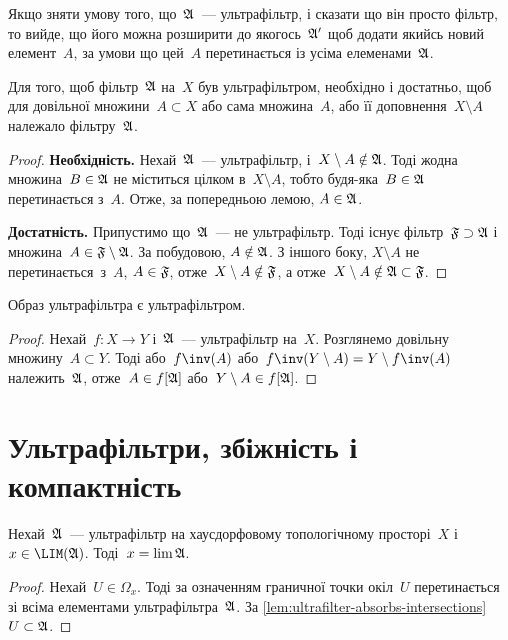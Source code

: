 \begin{remark}
    Якщо зняти умову того, що~$\frak A$~--- ультрафільтр, і сказати що він просто фільтр, то вийде, що його можна розширити до якогось~$\frak A'$ щоб додати якийсь новий елемент~$A$, за умови що цей~$A$  перетинається із усіма елеменами~$\frak A$.
\end{remark}

\begin{theorem}
    \label{th:ultrafilter-criterion}
    Для того, щоб фільтр~$\frak A$ на~$X$ був ультрафільтром, необхідно і достатньо, щоб для довільної множини~$A \subset X$ або сама множина~$A$, або її доповнення~$X \setminus A$ належало фільтру~$\frak A$.
\end{theorem}
\begin{proof}
    \textbf{Необхідність.} Нехай~$\frak A$~--- ультрафільтр, і~$X \setminus A \notin \frak A$. Тоді жодна множина~$B \in \frak A$ не міститься цілком в~$X \setminus A$, тобто будя-яка~$B \in \frak A$ перетинається з~$A$. Отже, за попередньою лемою, $A \in \frak A$. 
    
    \textbf{Достатність.} Припустимо що~$\frak A$~--- не ультрафільтр. Тоді існує фільтр~$\frak F \supset \frak A$ і множина~$A \in \frak F \setminus \frak A$. За побудовою, $A \notin \frak A$. З іншого боку, $X \setminus A$ не перетинається~з~$A$, $A \in \frak F$, отже~$X \setminus A \notin \frak F$, а отже~$X \setminus A \notin \frak A \subset \frak F$.
\end{proof}

\begin{corollary}
    \label{crl:ultrafilter-image-is-ultrafilter}
    Образ ультрафільтра є ультрафільтром.
\end{corollary}
\begin{proof}
    Нехай~$f: X \to Y$ і~$\frak A$~--- ультрафільтр на~$X$. Розглянемо довільну множину~$A \subset Y$. Тоді або~$f\inv (A)$ або~$f\inv (Y \setminus A) = Y \setminus f\inv (A)$ належить~$\frak A$, отже~$A \in f[\frak A]$ або~$Y \setminus A \in f[\frak A]$.
\end{proof}

\section{Ультрафільтри, збіжність і компактність}

\begin{lemma}
    \label{lem:ultrafilter-limitpoint-is-its-limit}
    Нехай~$\frak A$~--- ультрафільтр на хаусдорфовому топологічному просторі~$X$ і~$x \in \LIM(\frak A)$. Тоді~$x = \lim \frak A$.
\end{lemma}
\begin{proof}
    Нехай~$U \in \Omega_x$. Тоді за означенням граничної точки окіл~$U$ перетинається зі всіма елементами ультрафільтра~$\frak A$. За \cref{lem:ultrafilter-absorbs-intersections}~$U \subset \frak A$.
\end{proof}

